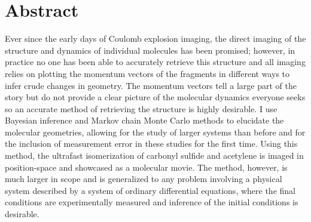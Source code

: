 \begingroup
\let\clearpage\relax
\let\cleardoublepage\relax
\let\cleardoublepage\relax

\chapter*{Abstract}
Ever since the early days of Coulomb explosion imaging, the direct imaging of the structure and dynamics of individual molecules has been promised; however, in practice no one has been able to accurately retrieve this structure and all imaging relies on plotting the momentum vectors of the fragments in different ways to infer crude changes in geometry. The momentum vectors tell a large part of the story but do not provide a clear picture of the molecular dynamics everyone seeks so an accurate method of retrieving the structure is highly desirable. I use Bayesian inference and Markov chain Monte Carlo methods to elucidate the molecular geometries, allowing for the study of larger systems than before and for the inclusion of measurement error in these studies for the first time. Using this method, the ultrafast isomerization of carbonyl sulfide and acetylene is imaged in position-space and showcased as a molecular movie. The method, however, is much larger in scope and is generalized to any problem involving a physical system described by a system of ordinary differential equations, where the final conditions are experimentally measured and inference of the initial conditions is desirable.

\vfill

\endgroup			

\vfill